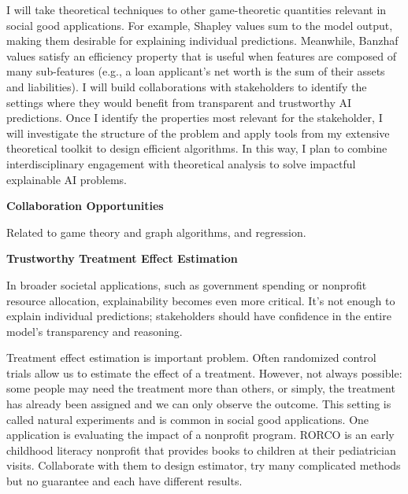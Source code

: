 \documentclass[11pt]{article}
\begin{document}
{I will take theoretical techniques to other game-theoretic quantities relevant in social good applications.
For example, Shapley values sum to the model output, making them desirable for explaining individual predictions.
Meanwhile, Banzhaf values satisfy an efficiency property that is useful when features are composed of many sub-features (e.g., a loan applicant's net worth is the sum of their assets and liabilities).
I will build collaborations with stakeholders to identify the settings where they would benefit from transparent and trustworthy AI predictions.
Once I identify the properties most relevant for the stakeholder, I will investigate the structure of the problem and apply tools from my extensive theoretical toolkit to design efficient algorithms.
In this way, I plan to combine interdisciplinary engagement with theoretical analysis to solve impactful explainable AI problems.

{ \large \textbf{Collaboration Opportunities}}

Related to game theory and graph algorithms, and regression.

\begin{center}
    { \large \textbf{Trustworthy Treatment Effect Estimation}}    
\end{center}

In broader societal applications, such as government spending or nonprofit resource allocation, explainability becomes even more critical. It’s not enough to explain individual predictions; stakeholders should have confidence in the entire model’s transparency and reasoning. 

Treatment effect estimation is important problem.
Often randomized control trials allow us to estimate the effect of a treatment.
However, not always possible: some people may need the treatment more than others, or simply, the treatment has already been assigned and we can only observe the outcome.
This setting is called natural experiments and is common in social good applications.
One application is evaluating the impact of a nonprofit program.
RORCO is an early childhood literacy nonprofit that provides books to children at their pediatrician visits.
Collaborate with them to design estimator, try many complicated methods but no guarantee and each have different results.


}
\end{document}

